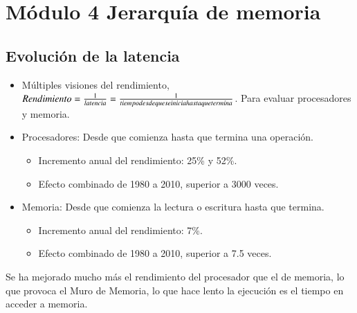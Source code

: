 \documentclass[12pt, twoside, openright]{report} %
\begin{document}
  \chapter{Módulo 4 Jerarquía de memoria}
  \section{Evolución de la latencia}

    \begin{itemize}
    
    \item
      Múltiples visiones del rendimiento,
      \(Rendimiento =\frac 1 {latencia}= \frac 1 {tiempo\space desde\space que\space se\space inicia\space hasta\space que\space termina}\).
      Para evaluar procesadores y memoria.
    \item
      Procesadores: Desde que comienza hasta que termina una operación.

      \begin{itemize}
      
      \item
        Incremento anual del rendimiento: 25\% y 52\%.
      \item
        Efecto combinado de 1980 a 2010, superior a 3000 veces.
      \end{itemize}
    \item
      Memoria: Desde que comienza la lectura o escritura hasta que
      termina.

      \begin{itemize}
      
      \item
        Incremento anual del rendimiento: 7\%.
      \item
        Efecto combinado de 1980 a 2010, superior a 7.5 veces.
      \end{itemize}
    \end{itemize}

    Se ha mejorado mucho más el rendimiento del procesador que el de
    memoria, lo que provoca el Muro de Memoria, lo que hace lento la
    ejecución es el tiempo en acceder a memoria.
  
\end{document}
